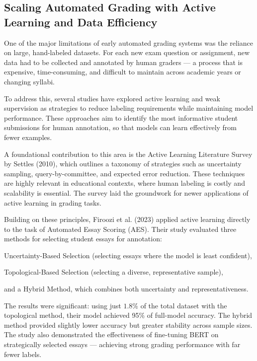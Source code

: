 \documentclass[a4paper,twoside,12pt]{report}
\begin{document}
\subsection{Scaling Automated Grading with Active Learning and Data Efficiency}
One of the major limitations of early automated grading systems was the reliance on large, hand-labeled datasets. For each new exam question or assignment, new data had to be collected and annotated by human graders — a process that is expensive, time-consuming, and difficult to maintain across academic years or changing syllabi.

To address this, several studies have explored active learning and weak supervision as strategies to reduce labeling requirements while maintaining model performance. These approaches aim to identify the most informative student submissions for human annotation, so that models can learn effectively from fewer examples.

A foundational contribution to this area is the Active Learning Literature Survey by Settles (2010), which outlines a taxonomy of strategies such as uncertainty sampling, query-by-committee, and expected error reduction. These techniques are highly relevant in educational contexts, where human labeling is costly and scalability is essential. The survey laid the groundwork for newer applications of active learning in grading tasks.

Building on these principles, Firoozi et al. (2023) applied active learning directly to the task of Automated Essay Scoring (AES). Their study evaluated three methods for selecting student essays for annotation:
\begin{itemize}
 {
  \item Uncertainty-Based Selection (selecting essays where the model is least confident),
  \item Topological-Based Selection (selecting a diverse, representative sample),
 \item and a Hybrid Method, which combines both uncertainty and representativeness.
 }
\end{itemize}
The results were significant: using just $1.8\%$ of the total dataset with the topological method, their model achieved 95\% of full-model accuracy. The hybrid method provided slightly lower accuracy but greater stability across sample sizes. The study also demonstrated the effectiveness of fine-tuning BERT on strategically selected essays — achieving strong grading performance with far fewer labels.
\end{document}
